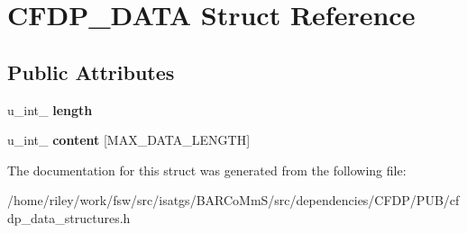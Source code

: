 \hypertarget{struct_c_f_d_p___d_a_t_a}{}\section{C\+F\+D\+P\+\_\+\+D\+A\+TA Struct Reference}
\label{struct_c_f_d_p___d_a_t_a}
\subsection*{Public Attributes}
\begin{DoxyCompactItemize}
\item 
u\+\_\+int\+\_ {\bfseries length}\hypertarget{struct_c_f_d_p___d_a_t_a_aa821731a5a0d614582dd426dd40d5727}{}\label{struct_c_f_d_p___d_a_t_a_aa821731a5a0d614582dd426dd40d5727}

\item 
u\+\_\+int\+\_ {\bfseries content} \mbox{[}M\+A\+X\+\_\+\+D\+A\+T\+A\+\_\+\+L\+E\+N\+G\+TH\mbox{]}\hypertarget{struct_c_f_d_p___d_a_t_a_aee1f28cda84b9c8858154a148f6cb137}{}\label{struct_c_f_d_p___d_a_t_a_aee1f28cda84b9c8858154a148f6cb137}

\end{DoxyCompactItemize}


The documentation for this struct was generated from the following file\+:\begin{DoxyCompactItemize}
\item 
/home/riley/work/fsw/src/isatgs/\+B\+A\+R\+Co\+Mm\+S/src/dependencies/\+C\+F\+D\+P/\+P\+U\+B/cfdp\+\_\+data\+\_\+structures.\+h\end{DoxyCompactItemize}
